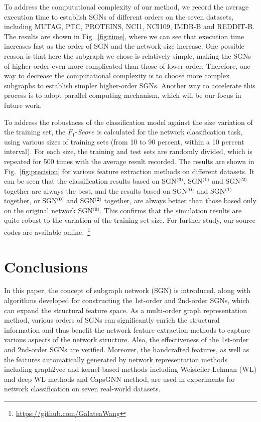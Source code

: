 \documentclass[10pt,journal,compsoc]{IEEEtran}
\begin{document}
To address the computational complexity of our method, we record the average execution time to establish SGNs of different orders on the seven datasets, including MUTAG, PTC, PROTEINS, NCI1, NCI109, IMDB-B and REDDIT-B. The results are shown in Fig.~\ref{fig:time}, where we can see that execution time increases fast as the order of SGN and the network size increase. One possible reason is that here the subgraph we chose is relatively simple, making the SGNs of higher-order even more complicated than those of lower-order. Therefore, one way to decrease the computational complexity is to choose more complex subgraphs to establish simpler higher-order SGNs. Another way to accelerate this process is to adopt parallel computing mechanism, which will be our focus in future work.

To address the robustness of the classification model against the size variation of the training set, the $F_1$-$Score$ is calculated for the network classification task, using various sizes of training sets (from 10 to 90 percent, within a 10 percent interval). For each size, the training and test sets are randomly divided, which is repeated for 500 times with the average result recorded. The results are shown in Fig.~\ref{fig:precision} for various feature extraction methods on different datasets. It can be seen that the classification results based on SGN$^{\textbf{(0)}}$, SGN$^{\textbf{(1)}}$ and SGN$^{\textbf{(2)}}$ together are always the best, and the results based on SGN$^{\textbf{(0)}}$ and SGN$^{\textbf{(1)}}$ together, or SGN$^{\textbf{(0)}}$ and SGN$^{\textbf{(2)}}$ together, are always better than those based only on the original network SGN$^{\textbf{(0)}}$. This confirms that the simulation results are quite robust to the variation of the training set size. For further study, our source codes are available online.~\footnote{\url{https://github.com/GalateaWang}}

\section{Conclusions}\label{sec:Con}
In this paper, the concept of subgraph network (SGN) is introduced, along with algorithms developed for constructing the 1st-order and 2nd-order SGNs, which can expand the structural feature space. As a multi-order graph representation method, various orders of SGNs can significantly enrich the structural information and thus benefit the network feature extraction methods to capture various aspects of the network structure. Also, the effectiveness of the 1st-order and 2nd-order SGNs are verified. Moreover, the handcrafted features, as well as the features automatically generated by network representation methods including graph2vec and kernel-based methods including Weisfeiler-Lehman (WL) and deep WL methods and CapsGNN method, are used in experiments for network classification on seven real-world datasets.
\end{document}
